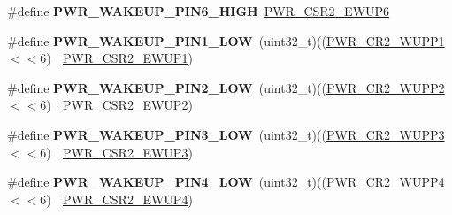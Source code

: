 \begin{DoxyCompactItemize}
\item 
\mbox{\label{group___p_w_r_ex___wake_up___pins_ga1c391eb7544741b9d981d0d38bfcf52e}} 
\#define {\bfseries P\+W\+R\+\_\+\+W\+A\+K\+E\+U\+P\+\_\+\+P\+I\+N6\+\_\+\+H\+I\+GH}~\mbox{\hyperlink{group___peripheral___registers___bits___definition_gadb014af72197cbc8e28fb4b46819827b}{P\+W\+R\+\_\+\+C\+S\+R2\+\_\+\+E\+W\+U\+P6}}
\item 
\mbox{\label{group___p_w_r_ex___wake_up___pins_ga71106c9ef5fe0ce824983011cf5812db}} 
\#define {\bfseries P\+W\+R\+\_\+\+W\+A\+K\+E\+U\+P\+\_\+\+P\+I\+N1\+\_\+\+L\+OW}~(uint32\+\_\+t)((\mbox{\hyperlink{group___peripheral___registers___bits___definition_ga1532f49233320e318a424fe32203b064}{P\+W\+R\+\_\+\+C\+R2\+\_\+\+W\+U\+P\+P1}}$<$$<$6) $\vert$ \mbox{\hyperlink{group___peripheral___registers___bits___definition_ga880b5a87187790660ad881a7d655d3c2}{P\+W\+R\+\_\+\+C\+S\+R2\+\_\+\+E\+W\+U\+P1}})
\item 
\mbox{\label{group___p_w_r_ex___wake_up___pins_ga2fa3e2360a56cd447dd49de0b075313f}} 
\#define {\bfseries P\+W\+R\+\_\+\+W\+A\+K\+E\+U\+P\+\_\+\+P\+I\+N2\+\_\+\+L\+OW}~(uint32\+\_\+t)((\mbox{\hyperlink{group___peripheral___registers___bits___definition_ga698e757c66109dcedd4467fef8fe547b}{P\+W\+R\+\_\+\+C\+R2\+\_\+\+W\+U\+P\+P2}}$<$$<$6) $\vert$ \mbox{\hyperlink{group___peripheral___registers___bits___definition_gaff300e908d03514860d64564c8238071}{P\+W\+R\+\_\+\+C\+S\+R2\+\_\+\+E\+W\+U\+P2}})
\item 
\mbox{\label{group___p_w_r_ex___wake_up___pins_gad1b726fce8345126b6bd9a38cc93de1a}} 
\#define {\bfseries P\+W\+R\+\_\+\+W\+A\+K\+E\+U\+P\+\_\+\+P\+I\+N3\+\_\+\+L\+OW}~(uint32\+\_\+t)((\mbox{\hyperlink{group___peripheral___registers___bits___definition_ga85b189fb0cb1d7a46e07536e093cc8ce}{P\+W\+R\+\_\+\+C\+R2\+\_\+\+W\+U\+P\+P3}}$<$$<$6) $\vert$ \mbox{\hyperlink{group___peripheral___registers___bits___definition_ga03a6c71dbb90a6d9686d26e6acdff7bb}{P\+W\+R\+\_\+\+C\+S\+R2\+\_\+\+E\+W\+U\+P3}})
\item 
\mbox{\label{group___p_w_r_ex___wake_up___pins_ga5345ca56a0983765d0d6a97c5a53d910}} 
\#define {\bfseries P\+W\+R\+\_\+\+W\+A\+K\+E\+U\+P\+\_\+\+P\+I\+N4\+\_\+\+L\+OW}~(uint32\+\_\+t)((\mbox{\hyperlink{group___peripheral___registers___bits___definition_gaf220472f6f0e8d46e1796d48602bdb18}{P\+W\+R\+\_\+\+C\+R2\+\_\+\+W\+U\+P\+P4}}$<$$<$6) $\vert$ \mbox{\hyperlink{group___peripheral___registers___bits___definition_ga75748b27a1d912938c41e41f1d08d01c}{P\+W\+R\+\_\+\+C\+S\+R2\+\_\+\+E\+W\+U\+P4}})

\end{DoxyCompactItemize}
